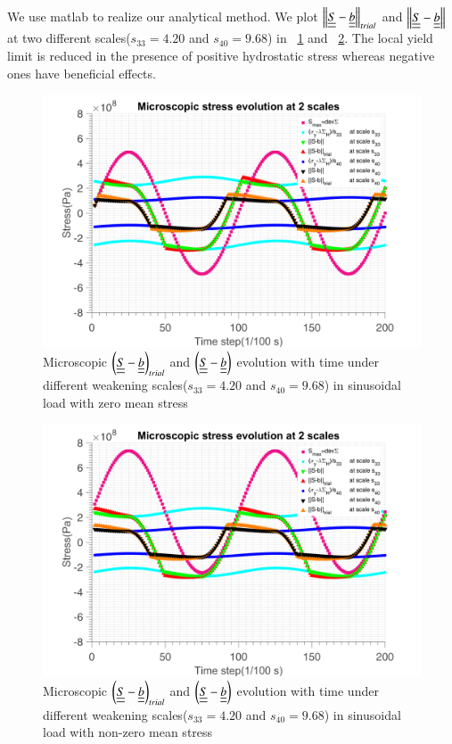 \documentclass[3p,times,number,review]{elsarticle}
\newcommand{\figref}[1]{\figurename~\ref{#1}}
\begin{document}
We use matlab to realize our analytical method. We plot $\left\|  \uline{\uline{S}}-\uline{\uline{b}}\right\|_{trial}$ and $\left\|  \uline{\uline{S}}-\uline{\uline{b}}\right\|$ at two different scales($s_{33}=4.20$ and $s_{40}=9.68$) in \figref{fig.trialsin0} and \figref{fig.trialsinm}. The local yield limit is reduced in the presence of positive hydrostatic stress whereas negative ones have beneficial effects.
\begin{figure}[!h]
	\centering
	\includegraphics[width=\textwidth]{figures//trialsin_0.png} 
	\caption{Microscopic $\left(  \uline{\uline{S}}-\uline{\uline{b}}\right)_{trial}$ and $\left( \uline{\uline{S}}-\uline{\uline{b}}\right)$ evolution with time under different weakening scales($s_{33}=4.20$ and $s_{40}=9.68$) in sinusoidal load with zero mean stress}
	\label{fig.trialsin0}
\end{figure}
\begin{figure}[!h]
	\centering
	\includegraphics[width=\textwidth]{figures//trialsin_m.png} 
	\caption{Microscopic $\left(  \uline{\uline{S}}-\uline{\uline{b}}\right)_{trial}$ and $\left( \uline{\uline{S}}-\uline{\uline{b}}\right)$ evolution with time under different weakening scales($s_{33}=4.20$ and $s_{40}=9.68$) in sinusoidal load with non-zero mean stress}
	\label{fig.trialsinm}
\end{figure}
\end{document}
